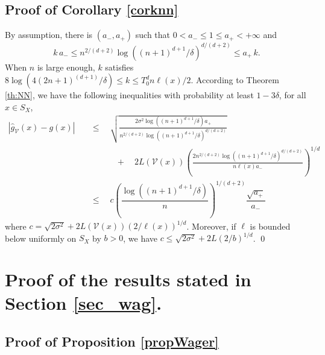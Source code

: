 \documentclass[paper=a4, fontsize=11pt]{scrartcl}
\begin{document}
\subsection*{Proof of Corollary \ref{corknn}}

By assumption, there is $(a_-,a_+) $ such that $ 0< a _- \leq 1\leq   a _+ < +\infty $ and $$  k \, a_-  \leq n^{2/(d+2)} \log((n+1)^{d+1}/\delta)^{d/(d+2)} \leq a_ + \, k.$$
When $n$ is large enough, $k$ satisfies $ 8 \log( 4 (2n+1)^{(d+1)} / \delta) \leq k \leq T_0^d n \ell(x) / 2.$
According to Theorem \ref{th:NN}, we have the following inequalities with probability at least $1-3\delta$, for all $x\in S_X$, \begin{align*} | \hat g_{\mathcal V}(x) - g(x)| \quad &\leq \quad \sqrt{\frac{2\sigma^2\log ( {(n+1)^{d+1}/\delta })  a_+ }{ n^{2/(d+2)} \log((n+1)^{d+1}/\delta)^{d/(d+2)} }} \\ &\qquad \quad + \quad  2 L(\mathcal{V}(x)) \left( \frac{2 n^{2/(d+2)} \log((n+1)^{d+1}/\delta)^{d/(d+2)} }{n  \ell(x) a_- } \right)^{1/d} \\ &\leq \quad c \left( \dfrac{\log((n+1)^{d+1}/\delta)}{n}\right)^{1/(d+2)}  \dfrac{\sqrt{a_+}}{a_-}\end{align*} where $c = \sqrt{2\sigma^2} + 2 L(\mathcal{V}(x)) \left(2/\ell(x) \right)^{1/d}$.   Moreover, if $\ell$ is bounded below uniformly on $S_X$ by $b > 0$, we have $c\leq \sqrt{2\sigma^2} + 2 L \left(2/b\right)^{1/d}$. \qed    

     
\section{Proof of the results stated in Section \ref{sec_wag}.}


\subsection*{Proof of Proposition \ref{propWager}}
\end{document}
